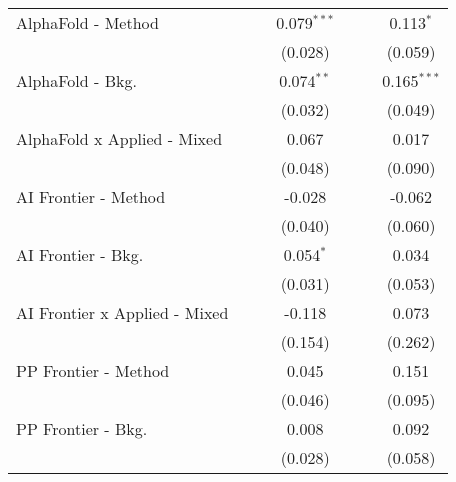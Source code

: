 \begin{tabular}{lcccccc}
   AlphaFold - Method             &               &               & 0.079$^{***}$ &              &              & 0.113$^{*}$\\   
                                  &               &               & (0.028)       &              &              & (0.059)\\   
   AlphaFold - Bkg.               &               &               & 0.074$^{**}$  &              &              & 0.165$^{***}$\\   
                                  &               &               & (0.032)       &              &              & (0.049)\\   
   AlphaFold x Applied - Mixed    &               &               & 0.067         &              &              & 0.017\\   
                                  &               &               & (0.048)       &              &              & (0.090)\\   
   AI Frontier - Method           &               &               & -0.028        &              &              & -0.062\\   
                                  &               &               & (0.040)       &              &              & (0.060)\\   
   AI Frontier - Bkg.             &               &               & 0.054$^{*}$   &              &              & 0.034\\   
                                  &               &               & (0.031)       &              &              & (0.053)\\   
   AI Frontier x Applied - Mixed  &               &               & -0.118        &              &              & 0.073\\   
                                  &               &               & (0.154)       &              &              & (0.262)\\   
   PP Frontier - Method           &               &               & 0.045         &              &              & 0.151\\   
                                  &               &               & (0.046)       &              &              & (0.095)\\   
   PP Frontier - Bkg.             &               &               & 0.008         &              &              & 0.092\\   
                                  &               &               & (0.028)       &              &              & (0.058)\\   

\end{tabular}
